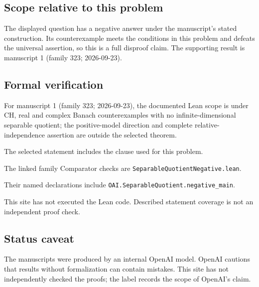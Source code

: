\documentclass[11pt]{article}
\begin{document}
\subsection{Scope relative to this problem}
The displayed question has a negative answer under the manuscript's stated construction. Its counterexample meets the conditions in this problem and defeats the universal assertion, so this is a full disproof claim. The supporting result is manuscript 1 (family 323; 2026-09-23).

\subsection{Formal verification}
For manuscript 1 (family 323; 2026-09-23), the documented Lean scope is under CH, real and complex Banach counterexamples with no infinite-dimensional separable quotient; the positive-model direction and complete relative-independence assertion are outside the selected theorem.

The selected statement includes the clause used for this problem.

The linked family Comparator checks are \texttt{SeparableQuotientNegative.lean}.

Their named declarations include \texttt{OAI.SeparableQuotient.negative\_main}.

This site has not executed the Lean code. Described statement coverage is not an independent proof check.

\subsection{Status caveat}
The manuscripts were produced by an internal OpenAI model. OpenAI cautions that results without formalization can contain mistakes. This site has not independently checked the proofs; the label records the scope of OpenAI's claim.
\end{document}
